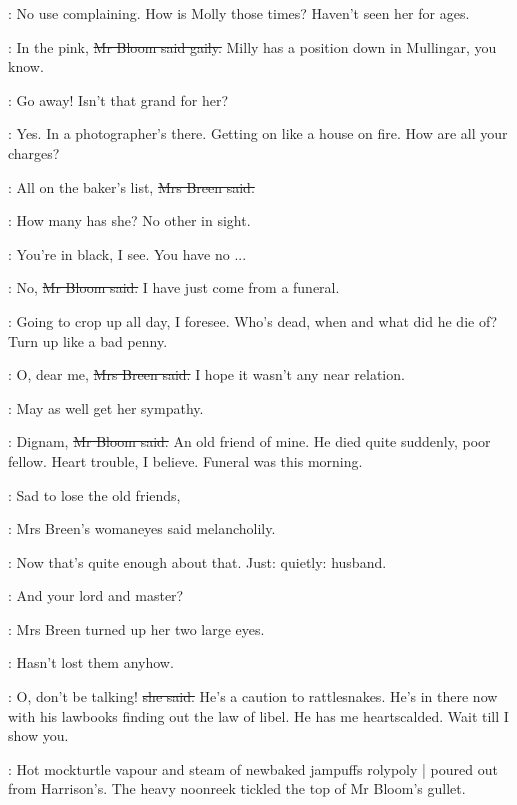 \josie:
No use complaining.
How is Molly those times?
Haven't seen her for ages.

\Bloom:
In the pink,
\sout{Mr Bloom said gaily.}
Milly has a position down in Mullingar, you know.

\josie:
Go away!
Isn't that grand for her?

\Bloom:
Yes.
In a photographer's there.
Getting on like a house on fire.
How are all your charges?%

\josie:
All on the baker's list,
\sout{Mrs Breen said.}

\BloomInt:
How many has she?
No other in sight.

\josie:
You're in black, I see.
You have no ...

\Bloom:
No,
\sout{Mr Bloom said.}
I have just come from a funeral.

\BloomInt:
Going to crop up all day, I foresee.
Who's dead,
when and what did he die of?
Turn up like a bad penny.

\josie:
O, dear me,
\sout{Mrs Breen said.}
I hope it wasn't any near relation.

\BloomInt:
May as well get her sympathy.

\Bloom:
Dignam,
\sout{Mr Bloom said.}
An old friend of mine.
He died quite suddenly,
poor fellow.
Heart trouble, I believe.
Funeral was this morning.


\josie:
Sad to lose the old friends,

:
Mrs Breen's womaneyes said melancholily.

\BloomInt:
Now that's quite enough about that.
Just:
quietly:
husband.

\Bloom:
And your lord and master?

:
Mrs Breen turned up her two large eyes.

\BloomInt:
Hasn't lost them anyhow.

\josie:
O, don't be talking!
\sout{she said.}
He's a caution to rattlesnakes.
He's in there now with his lawbooks finding out the law of libel.
He has me heartscalded.
Wait till I show you.

:
Hot mockturtle vapour and steam of newbaked jampuffs rolypoly |
poured out from Harrison's.
The heavy noonreek tickled the top of Mr Bloom's gullet.

